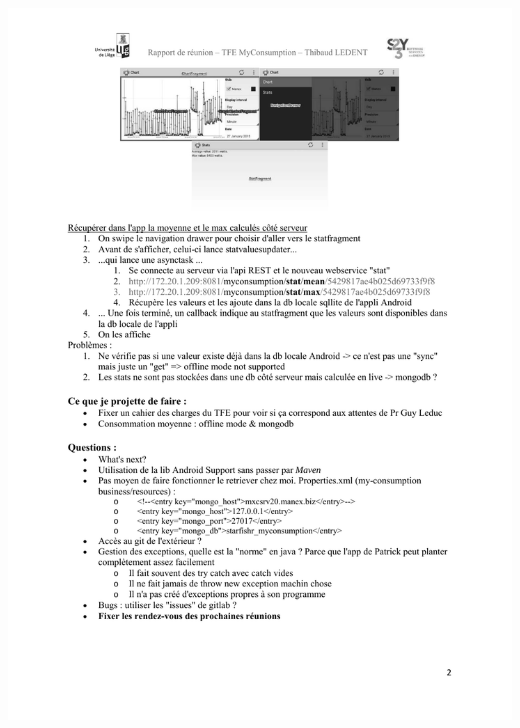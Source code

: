 \documentclass[a4paper, oneside, 11pt]{book}
\begin{document}
\includegraphics[width=1\textwidth]{reports_NB_Part9.pdf}
\newpage
\end{document}
